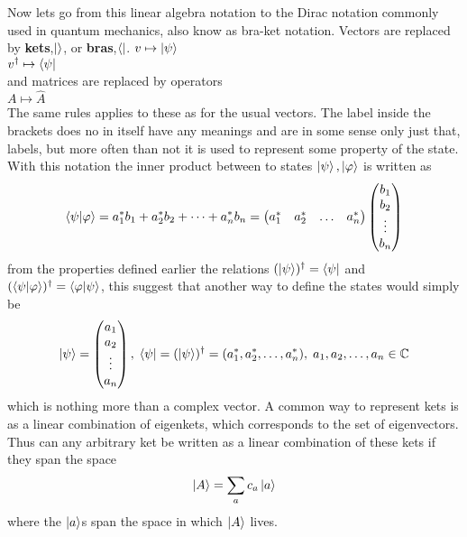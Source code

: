 Now lets go from this linear algebra notation to the Dirac notation commonly used in quantum mechanics, also know as bra-ket notation.
Vectors are replaced by \textbf{kets},$\ket{}$, or \textbf{bras},$\bra{}$. 
$v \mapsto \ket{\psi}$ \\
$v^\dagger \mapsto \bra{\psi}$\\
and matrices are replaced by operators\\
$A \mapsto \hat{A}$\\
The same rules applies to these as for the usual vectors.
The label inside the brackets does no in itself have any meanings and are in some sense only just that, labels, but more often than not it is used to represent some property of the state. With this notation the inner product between to states $\ket{\psi},\ket{\varphi}$ is written as 
\begin{equation}
\bra{\psi}\ket{\varphi} = a_1^{*}b_1 + a_2^{*}b_2 + \dots + a_n^{*}b_n = \begin{pmatrix} a_1^{*} & a_2^{*} & \dots & a_n^{*}\end{pmatrix} \begin{pmatrix} b_1 \\ b_2 \\ \vdots \\ b_n\end{pmatrix}
\end{equation}
from the properties defined earlier the relations $(\ket{\psi})^\dagger = \bra{\psi}$ and $ (\bra{\psi}\ket{\varphi})^\dagger = \bra{\varphi}\ket{\psi}$,
this suggest that another way to define the states would simply be
\begin{equation}
\ket{\psi} = \begin{pmatrix}
a_1 \\ a_2 \\ \vdots \\ a_n
\end{pmatrix},\;
\bra{\psi} = (\ket{\psi})^{\dagger} = (a_1^{*}, a_2^{*}, \dots, a_n^{*}),\; a_1,a_2,\dots,a_n \in \mathbb{C}
\end{equation}
which is nothing more than a complex vector. A common way to represent kets is as a linear combination of eigenkets, which corresponds to the set of eigenvectors. Thus can any arbitrary ket be written as a linear combination of these kets if they span the space
\begin{equation}
\ket{A} = \sum_{a} c_{a}\ket{a}
\end{equation}
where the $\ket{a}$s span the space in which $\ket{A}$ lives.
